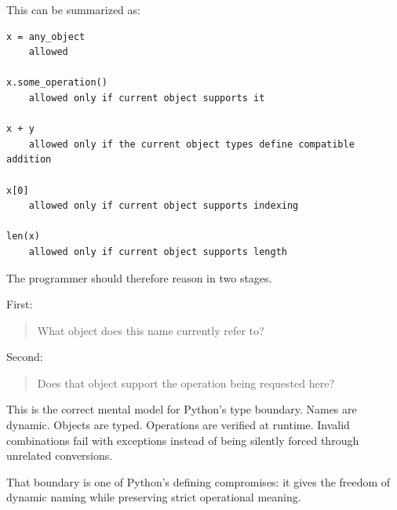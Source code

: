 This can be summarized as:

\begin{verbatim}
x = any_object
    allowed

x.some_operation()
    allowed only if current object supports it

x + y
    allowed only if the current object types define compatible addition

x[0]
    allowed only if current object supports indexing

len(x)
    allowed only if current object supports length
\end{verbatim}

The programmer should therefore reason in two stages.

First:

\begin{quote}
What object does this name currently refer to?
\end{quote}

Second:

\begin{quote}
Does that object support the operation being requested here?
\end{quote}

This is the correct mental model for Python's type boundary. Names are dynamic. Objects are typed. Operations are verified at runtime. Invalid combinations fail with exceptions instead of being silently forced through unrelated conversions.

That boundary is one of Python's defining compromises: it gives the freedom of dynamic naming while preserving strict operational meaning.
